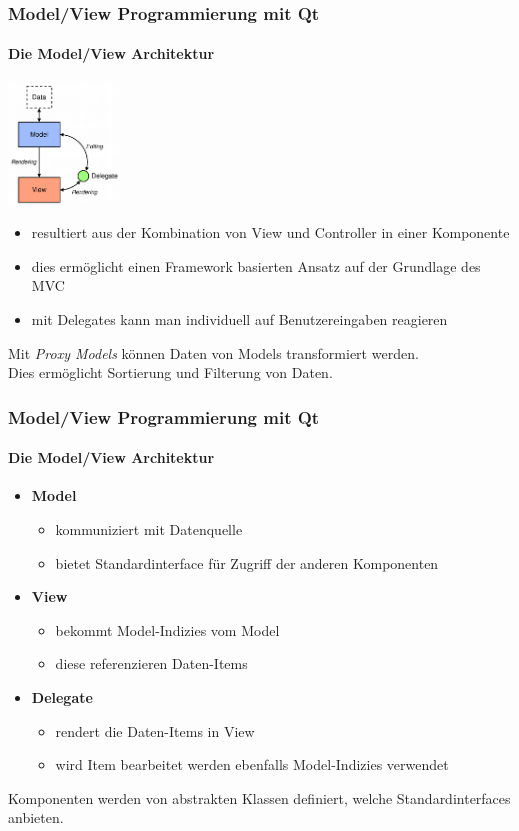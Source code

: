 \begin{frame}
	\frametitle{Model/View Programmierung mit Qt}
	\framesubtitle{Die Model/View Architektur}
	\begin{center}
		\includegraphics[width=3cm]{../mvc/modelview-overview.png}
	\end{center}
	\begin{itemize}
		\item resultiert aus der Kombination von View und Controller in einer Komponente
		\item dies ermöglicht einen Framework basierten Ansatz auf der Grundlage des MVC
		\item mit Delegates kann man individuell auf Benutzereingaben reagieren
	\end{itemize}
	\begin{center}
		{\small Mit {\itshape Proxy Models} können Daten von Models transformiert werden.\\
		Dies ermöglicht Sortierung und Filterung von Daten.}
	\end{center}
\end{frame}


\begin{frame}
	\frametitle{Model/View Programmierung mit Qt}
	\framesubtitle{Die Model/View Architektur}
	\begin{itemize}
		\item {\bf Model}
		\begin{itemize}
			\item kommuniziert mit Datenquelle
			\item bietet Standardinterface für Zugriff der anderen Komponenten
		\end{itemize}
		\item {\bf View}
		\begin{itemize}
			\item bekommt Model-Indizies vom Model
			\item diese referenzieren Daten-Items
		\end{itemize}
		\item {\bf Delegate}
		\begin{itemize}
			\item rendert die Daten-Items in View
			\item wird Item bearbeitet werden ebenfalls Model-Indizies verwendet
		\end{itemize} 
	\end{itemize}
	\begin{center}
		Komponenten werden von abstrakten Klassen definiert, welche Standardinterfaces anbieten.
	\end{center}
\end{frame}

